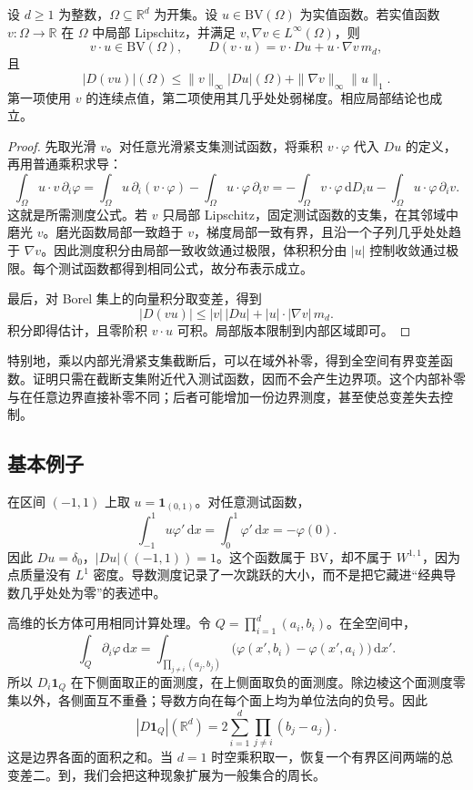 \begin{proposition}\label{b1:prop:bv-product-rule}
设 \(d\ge1\) 为整数，\(\Omega\subseteq\mathbb R^d\) 为开集。设 \(u\in\mathrm{BV}(\Omega)\) 为实值函数。若实值函数 \(v:\Omega\to\mathbb R\) 在 \(\Omega\) 中局部 Lipschitz，并满足 \(v,\nabla v\in L^\infty(\Omega)\)，则
\[
 v\cdot u\in \mathrm{BV}(\Omega),\qquad
 D(v\cdot u)=v\cdot Du+u\cdot\nabla v\,m_d,
\]
且
\[
 |D(vu)|(\Omega)
 \le\|v\|_\infty|Du|(\Omega)
       +\|\nabla v\|_\infty\|u\|_1.
\]
第一项使用 \(v\) 的连续点值，第二项使用其几乎处处弱梯度。相应局部结论也成立。
\end{proposition}
\begin{proof}
先取光滑 \(v\)。对任意光滑紧支集测试函数，将乘积 \(v\cdot\varphi\) 代入 \(Du\) 的定义，再用普通乘积求导：
\[
 \int_\Omega u\cdot v\,\partial_i\varphi
 =\int_\Omega u\,\partial_i(v\cdot\varphi)
       -\int_\Omega u\cdot\varphi\,\partial_i v
 =-\int_\Omega v\cdot\varphi\,\mathrm dD_i u
       -\int_\Omega u\cdot\varphi\,\partial_i v.
\]
这就是所需测度公式。若 \(v\) 只局部 Lipschitz，固定测试函数的支集，在其邻域中磨光 \(v\)。磨光函数局部一致趋于 \(v\)，梯度局部一致有界，且沿一个子列几乎处处趋于 \(\nabla v\)。因此测度积分由局部一致收敛通过极限，体积积分由 \(|u|\) 控制收敛通过极限。每个测试函数都得到相同公式，故分布表示成立。

最后，对 Borel 集上的向量积分取变差，得到
\[
 |D(vu)|\le |v|\,|Du|+|u|\cdot|\nabla v|\,m_d.
\]
积分即得估计，且零阶积 \(v\cdot u\) 可积。局部版本限制到内部区域即可。
\end{proof}

特别地，乘以内部光滑紧支集截断后，可以在域外补零，得到全空间有界变差函数。证明只需在截断支集附近代入测试函数，因而不会产生边界项。这个内部补零与在任意边界直接补零不同；后者可能增加一份边界测度，甚至使总变差失去控制。

\subsection{基本例子}
\label{b1:subsec:270104}

在区间 \((-1,1)\) 上取 \(u=\mathbf1_{(0,1)}\)。对任意测试函数，
\[
 \int_{-1}^1u\varphi'\,\mathrm dx
 =\int_0^1\varphi'\,\mathrm dx=-\varphi(0).
\]
因此 \(Du=\delta_0\)，\(|Du|((-1,1))=1\)。这个函数属于 \(\mathrm{BV}\)，却不属于 \(W^{1,1}\)，因为点质量没有 \(L^1\) 密度。导数测度记录了一次跳跃的大小，而不是把它藏进“经典导数几乎处处为零”的表述中。

\ProseParagraphBreak

高维的长方体可用相同计算处理。令 \(Q=\prod_{i=1}^d(a_i,b_i)\)。在全空间中，
\[
 \int_Q\partial_i\varphi\,\mathrm dx
 =\int_{\prod_{j\ne i}(a_j,b_j)}
       \bigl(\varphi(x',b_i)-\varphi(x',a_i)\bigr)\,\mathrm dx'.
\]
所以 \(D_i\mathbf1_Q\) 在下侧面取正的面测度，在上侧面取负的面测度。除边棱这个面测度零集以外，各侧面互不重叠；导数方向在每个面上均为单位法向的负号。因此
\[
 |D\mathbf1_Q|(\mathbb R^d)
 =2\sum_{i=1}^d\prod_{j\ne i}(b_j-a_j).
\]
这是边界各面的面积之和。当 \(d=1\) 时空乘积取一，恢复一个有界区间两端的总变差二。到，我们会把这种现象扩展为一般集合的周长。

